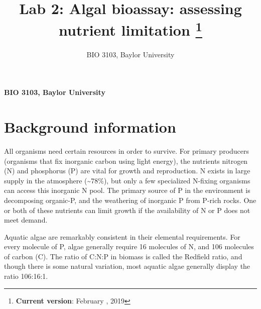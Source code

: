 \documentclass[11pt,]{article}
\title{Lab 2: Algal bioassay: assessing nutrient limitation \thanks{\textbf{Current version}: February , 2019}  }
\author{\Large BIO 3103, Baylor University\vspace{0.05in} \newline\normalsize\emph{}  }
\date{}
\newcommand*{\authorfont}{\fontfamily{phv}\selectfont}
\begin{document}
	
%



{%
\setlength{\parindent}{0pt}
\thispagestyle{plain}
{\fontsize{18}{20}\selectfont\raggedright 
\maketitle  %

}

{
   \vskip 13.5pt\relax \normalsize\fontsize{11}{12} 
\textbf{\authorfont BIO 3103, Baylor University} \hskip 15pt \emph{\small }   

}

}




\noindent  \section{Background information}\label{background-information}

All organisms need certain resources in order to survive. For primary
producers (organisms that fix inorganic carbon using light energy), the
nutrients nitrogen (N) and phosphorus (P) are vital for growth and
reproduction. N exists in large supply in the atmosphere
(\textasciitilde{}78\%), but only a few specialized N-fixing organisms
can access this inorganic N pool. The primary source of P in the
environment is decomposing organic-P, and the weathering of inorganic P
from P-rich rocks. One or both of these nutrients can limit growth if
the availability of N or P does not meet demand.

Aquatic algae are remarkably consistent in their elemental requirements.
For every molecule of P, algae generally require 16 molecules of N, and
106 molecules of carbon (C). The ratio of C:N:P in biomass is called the
Redfield ratio, and though there is some natural variation, most aquatic
algae generally display the ratio 106:16:1.
\end{document}
